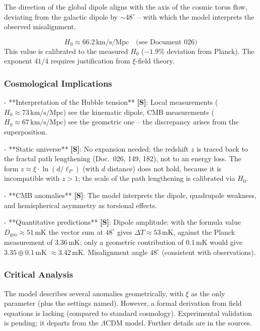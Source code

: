 The direction of the global dipole aligns with the axis of the cosmic torus flow, deviating from the galactic dipole by $\sim 48^\circ$ – with which the model interprets the observed misalignment.

\[
H_0 \approx 66.2\,\text{km/s/Mpc} \quad \text{(see Document~026)}
\]
This value is calibrated to the measured $H_0$ ($-1.9\%$ deviation from Planck). The exponent $41/4$ requires justification from $\xi$-field theory.

\subsubsection{Cosmological Implications}

- **Interpretation of the Hubble tension** \textbf{[S]}: Local measurements ($H_0 \approx 73\,\text{km/s/Mpc}$) see the kinematic dipole, CMB measurements ($H_0 \approx 67\,\text{km/s/Mpc}$) see the geometric one – the discrepancy arises from the superposition.

- **Static universe** \textbf{[S]}: No expansion needed; the redshift $z$ is traced back to the fractal path lengthening (Doc.~026, 149, 182), not to an energy loss. The form $z \approx \xi \cdot \ln(d / \ell_P)$ (with $d$ distance) does not hold, because it is incompatible with $z > 1$; the scale of the path lengthening is calibrated via $H_0$.

- **CMB anomalies** \textbf{[S]}: The model interprets the dipole, quadrupole weakness, and hemispherical asymmetry as torsional effects.

- **Quantitative predictions** \textbf{[S]}: Dipole amplitude: with the formula value $D_{\text{geo}} \approx 51$\,mK the vector sum at $48^\circ$ gives $\Delta T \approx 53$\,mK, against the Planck measurement of $3.36$\,mK; only a geometric contribution of $0.1$\,mK would give $3.35 \oplus 0.1$\,mK $\approx 3.42$\,mK. Misalignment angle $48^\circ$ (consistent with observations).

\subsubsection{Critical Analysis}

The model describes several anomalies geometrically, with $\xi$ as the only parameter (plus the settings named). However, a formal derivation from field equations is lacking (compared to standard cosmology). Experimental validation is pending; it departs from the $\Lambda$CDM model. Further details are in the sources.

